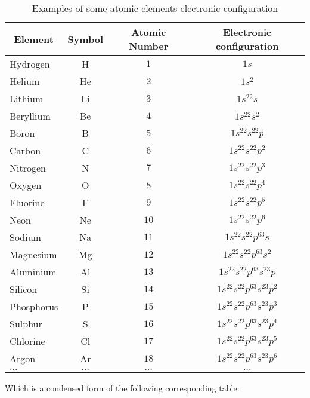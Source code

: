 	\begin{table}[H]
		\begin{center}
				\begin{tabular}{|l|c|c|c|}
					\hline
					\multicolumn{1}{c}{\cellcolor{black!30}\textbf{Element}} & 
	  \multicolumn{1}{c}{\cellcolor{black!30}\textbf{Symbol}} & 
	  \multicolumn{1}{c}{\cellcolor{black!30}\textbf{Atomic Number}}  & \multicolumn{1}{c}{\cellcolor{black!30}\textbf{Electronic configuration}} \\ \hline
				Hydrogen & H & $1$ & $1s$ \\ \hline
				Helium & He & $2$ & $1s^2$ \\ \hline
				Lithium & Li & $3$ & $1s^22s$ \\ \hline
				Beryllium & Be & $4$ & $1s^22s^2$ \\ \hline
				Boron & B & $5$ & $1s^22s^22p$ \\ \hline
				Carbon & C & $6$ & $1s^22s^22p^2$ \\ \hline
				Nitrogen & N & $7$ & $1s^22s^22p^3$ \\ \hline
				Oxygen & O & $8$ & $1s^22s^22p^4$ \\ \hline
				Fluorine & F & $9$ & $1s^22s^22p^5$ \\ \hline
				Neon & Ne & $10$ & $1s^22s^22p^6$ \\ \hline
				Sodium & Na & $11$ & $1s^22s^22p^63s$ \\ \hline
				Magnesium & Mg & $12$ & $1s^22s^22p^63s^2$ \\ \hline
				Aluminium & Al & $13$ & $1s^22s^22p^63s^23p$ \\ \hline
				Silicon & Si & $14$ & $1s^22s^22p^63s^23p^2$ \\ \hline
				Phosphorus & P & $15$ & $1s^22s^22p^63s^23p^3$ \\ \hline
				Sulphur & S & $16$ & $1s^22s^22p^63s^23p^4$ \\ \hline
				Chlorine & Cl & $17$ & $1s^22s^22p^63s^23p^5$ \\ \hline
				Argon & Ar & $18$ & $1s^22s^22p^63s^23p^6$ \\ \hline
				$\ldots$ & $\ldots$ & $\ldots$ & $\ldots$  \\ \hline
			\end{tabular}
		\end{center}
		\caption{Examples of some atomic elements electronic configuration}
	\end{table}
	Which is a condensed form of the following corresponding table:
